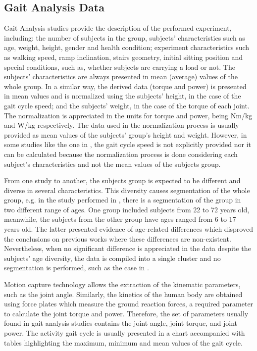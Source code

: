 \subsection{Gait Analysis Data}

Gait Analysis studies provide the description of the performed experiment, including: the number of subjects in the group, subjects' characteristics such as age, weight, height, gender and health condition; experiment characteristics such as walking speed, ramp inclination, stairs geometry, initial sitting position and special conditions, such as, whether subjects are carrying a load or not. The subjects' characteristics are always presented in mean (average) values of the whole group. In a similar way, the derived data (torque and power) is presented in mean values and is normalized using the subjects' height, in the case of the gait cycle speed; and the subjects' weight, in the case of the torque of each joint. The normalization is appreciated in the units for torque and power, being Nm/kg and W/kg respectively. The data used in the normalization process is usually provided as mean values of the subjects' group's height and weight. However, in some studies like the one in \cite{lee2008biomechanics}, the gait cycle speed is not explicitly provided nor it can be calculated because the normalization process is done considering each subject's characteristics and not the mean values of the subjects group. 

From one study to another, the subjects group is expected to be different and diverse in several characteristics. This diversity causes segmentation of the whole group, e.g. in the study performed in \cite{bovi2011multiple}, there is a segmentation of the group in two different range of ages. One group included subjects from 22 to 72 years old, meanwhile, the subjects from the other group have ages ranged from 6 to 17 years old. The latter presented evidence of age-related differences which disproved the conclusions on previous works where these differences are non-existent. Nevertheless, when no significant difference is appreciated in the data despite the subjects' age diversity, the data is compiled into a single cluster and no segmentation is performed, such as the case in \cite{lee2008biomechanics}.

Motion capture technology allows the extraction of the kinematic parameters, such as the joint angle. Similarly, the kinetics of the human body are obtained using force plates which measure the ground reaction forces, a required parameter to calculate the joint torque and power. Therefore, the set of parameters usually found in gait analysis studies contains the joint angle, joint torque, and joint power. The activity gait cycle is usually presented in a chart accompanied with tables highlighting the maximum, minimum and mean values of the gait cycle. 


